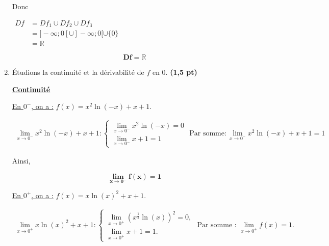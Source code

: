 \documentclass[12pt,a4paper]{article}
\begin{document}
\begin{enumerate}
          Donc

          \(
          \begin{aligned}
              Df & =Df_{1} \cup Df_{2} \cup Df_{3}        \\
                 & =]-\infty;0[ \cup ]-\infty;0[\cup\{0\} \\
                 & =\mathbb{R}
          \end{aligned}
          \)

          \begin{resultbox}
              \[
                  \mathbf{Df=\mathbb{R}}
              \]
          \end{resultbox}

    \item Étudions la continuité et la dérivabilité de \( f \) en 0. \hfill \textbf{(1,5 pt)}

          \underline{\textbf{Continuité}}

          \underline{En \( 0^- \), on a :} \( f(x) = x^2 \ln(-x) + x + 1. \)

          \(
          \begin{aligned}
              \lim\limits_{x \to 0^-}x^2 \ln(-x) + x + 1:
              \begin{cases}
                  \lim\limits_{x \to 0^-}x^2 \ln(-x)=0 \\
                  \lim\limits_{x \to 0^-} x + 1 =1
              \end{cases}\text{ Par somme}: \lim\limits_{x \to 0^-}x^2 \ln(-x) + x + 1 = 1
          \end{aligned}
          \)

          Ainsi,
          \begin{resultbox}
              \[
                  \mathbf{\lim\limits_{x \to 0^-} f(x) = 1}
              \]
          \end{resultbox}

          \underline{En \( 0^+ \), on a :} \( f(x) = x \ln(x)^2 + x + 1. \)

          \(
          \begin{aligned}
              \lim\limits_{x \to 0^+} x \ln(x)^2 + x + 1:
              \begin{cases}
                  \lim\limits_{x \to 0^+} (x^{\frac{1}{2}} \ln(x))^2 = 0, \\
                  \lim\limits_{x \to 0^+} x + 1 = 1.
              \end{cases}
              \text{ Par somme : } \lim\limits_{x \to 0^+} f(x) = 1.
          \end{aligned}
          \)


\end{enumerate}
\end{document}
